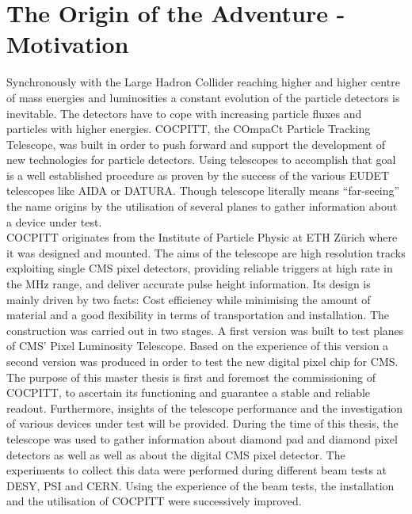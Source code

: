 \documentclass[british,11pt,a4paper]{memoir}
\begin{document}
\chapter{The Origin of the Adventure - Motivation}
Synchronously with the Large Hadron Collider reaching higher and higher centre of mass energies and luminosities a constant evolution of the particle detectors is inevitable. The detectors have to cope with increasing particle fluxes and particles with higher energies. COCPITT, the COmpaCt Particle Tracking Telescope, was built in order to push forward and support the development of new technologies for particle detectors. Using telescopes to accomplish that goal is a well established procedure as proven by the success of the various EUDET telescopes like AIDA or DATURA. Though telescope literally means ``far-seeing'' the name origins by the utilisation of several planes to gather information about a device under test.\\
COCPITT originates from the Institute of Particle Physic at ETH Z{\"u}rich where it was designed and mounted. The aims of the telescope are high resolution tracks  exploiting single CMS pixel detectors, providing reliable triggers at high rate in the MHz range, and deliver accurate pulse height information. Its design is mainly driven by two facts: Cost efficiency while minimising the amount of material and a good flexibility in terms of transportation and installation. The construction was carried out in two stages. A first version was built to test planes of CMS' Pixel Luminosity Telescope. Based on the experience of this version a second version was produced in order to test the new digital pixel chip for CMS.\\
The purpose of this master thesis is first and foremost the commissioning of COCPITT, to ascertain its functioning and guarantee a stable and reliable readout. Furthermore, insights of the telescope performance and the investigation of various devices under test will be provided. During the time of this thesis, the telescope was used to gather information about diamond pad and diamond pixel detectors as well as well as about the digital CMS pixel detector. The experiments to collect this data were performed during different beam tests at DESY, PSI and CERN. Using the experience of the beam tests, the installation and the utilisation of COCPITT were successively improved.
\end{document}
